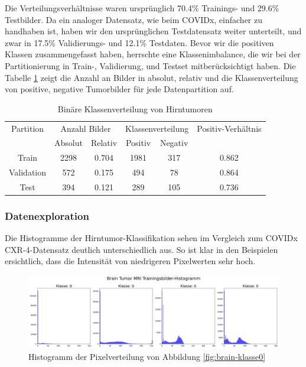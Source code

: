 Die Verteilungsverhältnisse waren ursprünglich 70.4\% Trainings- und 29.6\% Testbilder. Da ein analoger Datensatz, wie beim COVIDx, einfacher zu handhaben ist, haben wir den ursprünglichen Testdatensatz weiter unterteilt, und zwar in 17.5\% Validierungs- und 12.1\% Testdaten. Bevor wir die positiven Klassen zusammengefasst haben, herrschte eine Klassenimbalance, die wir bei der Partitionierung in Train-, Validierung, und Testset mitberücksichtigt haben. Die Tabelle \ref{tab:mri-binaere-klassenverteilung} zeigt die Anzahl an Bilder in absolut, relativ und die Klassenverteilung von positive, negative Tumorbilder für jede Datenpartition auf.

\begin{table}[ht]
\centering
\begin{tabular}{@{}cccccc@{}}
\toprule
Partition & \multicolumn{2}{c}{Anzahl Bilder} & \multicolumn{2}{c}{Klassenverteilung} & Positiv-Verhältnis\\ 
\cmidrule(lr){2-3} \cmidrule(lr){4-5} 
           & Absolut & Relativ & Positiv & Negativ \\ 
\midrule
Train      & 2298 & 0.704 & 1981 & 317 & 0.862 \\
Validation & 572  & 0.175 & 494  & 78  & 0.864 \\
Test       & 394  & 0.121 & 289  & 105 & 0.736 \\ 
\bottomrule
\end{tabular}
\caption{Binäre Klassenverteilung von Hirntumoren}
\label{tab:mri-binaere-klassenverteilung}
\end{table}

\subsubsection{Datenexploration}

Die Histogramme der Hirntumor-Klassifikation sehen im Vergleich zum COVIDx CXR-4-Datensatz deutlich unterschiedlich aus. So ist klar in den Beispielen ersichtlich, dass die Intensität von niedrigeren Pixelwerten sehr hoch.

\begin{figure}[ht]
    \centering
    \includegraphics[width=\linewidth]{01-images/03-data/brain-klasse0-hist.png}
    \caption{Histogramm der Pixelverteilung von Abbildung \ref{fig:brain-klasse0}}
    \label{fig:brain-klasse0-hist}
\end{figure}


